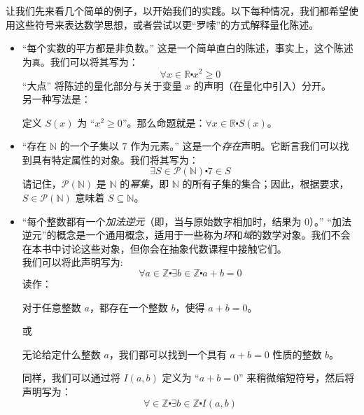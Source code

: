 \begin{example}
    让我们先来看几个简单的例子，以开始我们的实践。以下每种情况，我们都希望使用这些符号来表达数学思想，或者尝试以更``罗嗦''的方式解释量化陈述。
    \begin{itemize}
        \item ``每个实数的平方都是非负数。''
            这是一个简单直白的陈述，事实上，这个陈述为\verb|真|。我们可以将其写为：
            \[\forall x \in \mathbb{R} \centerdot x^2 \ge 0\]
            ``大点'' 将陈述的量化部分与关于变量 $x$ 的声明（在量化中引入）分开。\\
            另一种写法是：
            \begin{center}
                定义 $S(x)$ 为 ``$x^2 \ge 0$''。那么命题就是：$\forall x \in \mathbb{R} \centerdot S(x)$。
            \end{center}
        \item ``存在 $\mathbb{N}$ 的一个子集以 $7$ 作为元素。''
            这是一个\emph{存在}声明。它断言我们可以找到具有特定属性的对象。我们将其写为：
            \[\exists S \in \mathcal{P}(\mathbb{N}) \centerdot 7 \in S\]
            请记住，$\mathcal{P}(\mathbb{N})$ 是 $\mathbb{N}$ 的\emph{幂集}，即 $\mathbb{N}$ 的所有子集的集合；因此，根据要求，$S \in \mathcal{P}(\mathbb{N})$ 意味着 $S \subseteq \mathbb{N}$。
        \item ``每个整数都有一个\emph{加法逆元}（即，当与原始数字相加时，结果为 $0$）。''
            ``加法逆元''的概念是一个通用概念，适用于一些称为\emph{环}和\emph{域}的数学对象。我们不会在本书中讨论这些对象，但你会在抽象代数课程中接触它们。\\
            我们可以将此声明写为:
            \[\forall a \in \mathbb{Z} \centerdot \exists b \in \mathbb{Z} \centerdot a + b = 0\]
            读作：
            \begin{center}
                对于任意整数 $a$，都存在一个整数 $b$，使得 $a + b = 0$。
            \end{center}
            或
            \begin{center}
                无论给定什么整数 $a$，我们都可以找到一个具有 $a + b = 0$ 性质的整数 $b$。
            \end{center}
            同样，我们可以通过将 $I(a, b)$ 定义为 ``$a + b = 0$'' 来稍微缩短符号，然后将声明写为：
            \[\forall \in \mathbb{Z} \centerdot \exists b \in \mathbb{Z} \centerdot I(a, b)\]
    \end{itemize}
\end{example}

